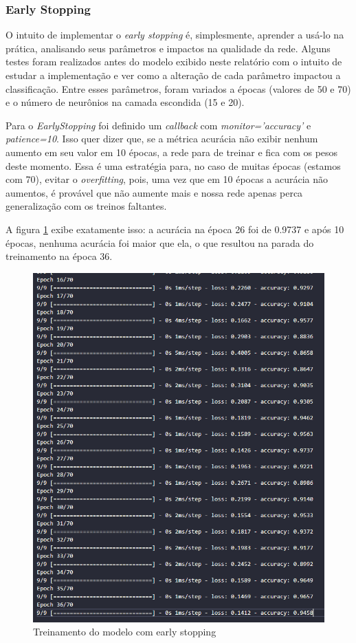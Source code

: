 \documentclass[12pt]{article}
\begin{document}
\subsubsection{Early Stopping}

O intuito de implementar o \textit{early stopping} é, simplesmente, aprender a usá-lo na prática, analisando seus parâmetros e impactos na qualidade da rede. Alguns testes foram realizados antes do modelo exibido neste relatório com o intuito de estudar a implementação e ver como a alteração de cada parâmetro impactou a classificação. Entre esses parâmetros, foram variados a épocas (valores de 50 e 70) e o número de neurônios na camada escondida (15 e 20).

Para o \textit{EarlyStopping} foi definido um \textit{callback} com \textit{monitor='accuracy'} e \textit{patience=10}. Isso quer dizer que, se a métrica acurácia não exibir nenhum aumento em seu valor em 10 épocas, a rede para de treinar e fica com os pesos deste momento. Essa é uma estratégia para, no caso de muitas épocas (estamos com 70), evitar o \textit{overfitting}, pois, uma vez que em 10 épocas a acurácia não aumentos, é provável que não aumente mais e nossa rede apenas perca generalização com os treinos faltantes.

A figura \ref{fig:fitearly} exibe exatamente isso: a acurácia na época 26 foi de 0.9737 e após 10 épocas, nenhuma acurácia foi maior que ela, o que resultou na parada do treinamento na época 36.
\begin{figure}[H]
	\centering
	\includegraphics[width=0.7\linewidth]{Imagens/earlystopping/fitearly}
	\caption{Treinamento do modelo com early stopping}
	\label{fig:fitearly}
\end{figure}
\end{document}
